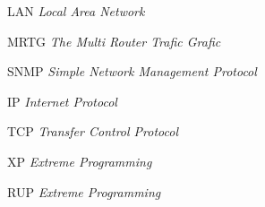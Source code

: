 
\begin{SingleSpace}

\begin{siglas}
\item[LAN] \textit{Local Area Network}
\item[MRTG] \textit{The Multi Router Trafic Grafic}
\item[SNMP] \textit{Simple Network Management Protocol}
\item[IP] \textit{Internet Protocol}
\item[TCP] \textit{Transfer Control Protocol}
\item[XP] \textit{Extreme Programming}
\item[RUP] \textit{Extreme Programming}
\end{siglas}

\end{SingleSpace}
